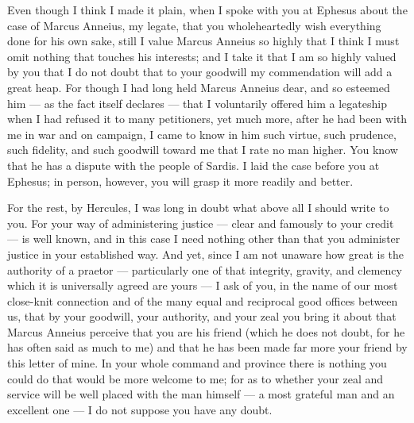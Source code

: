 

 Even though I think I made it plain, when I spoke with you at Ephesus about the case of Marcus Anneius, my legate, that you wholeheartedly wish everything done for his own sake, still I value Marcus Anneius so highly that I think I must omit nothing that touches his interests; and I take it that I am so highly valued by you that I do not doubt that to your goodwill my commendation will add a great heap. For though I had long held Marcus Anneius dear, and so esteemed him --- as the fact itself declares --- that I voluntarily offered him a legateship when I had refused it to many petitioners, yet much more, after he had been with me in war and on campaign, I came to know in him such virtue, such prudence, such fidelity, and such goodwill toward me that I rate no man higher. You know that he has a dispute with the people of Sardis. I laid the case before you at Ephesus; in person, however, you will grasp it more readily and better.

 For the rest, by Hercules, I was long in doubt what above all I should write to you. For your way of administering justice --- clear and famously to your credit --- is well known, and in this case I need nothing other than that you administer justice in your established way. And yet, since I am not unaware how great is the authority of a praetor --- particularly one of that integrity, gravity, and clemency which it is universally agreed are yours --- I ask of you, in the name of our most close-knit connection and of the many equal and reciprocal good offices between us, that by your goodwill, your authority, and your zeal you bring it about that Marcus Anneius perceive that you are his friend (which he does not doubt, for he has often said as much to me) and that he has been made far more your friend by this letter of mine. In your whole command and province there is nothing you could do that would be more welcome to me; for as to whether your zeal and service will be well placed with the man himself --- a most grateful man and an excellent one --- I do not suppose you have any doubt.
